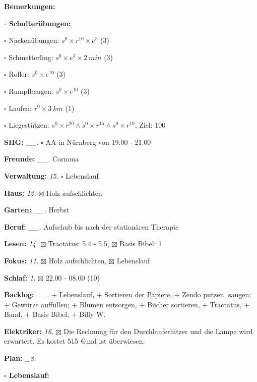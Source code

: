 \documentclass[10pt,a4paper]{article}
\newcommand\prop[1] {{\color {alizarin} {\bf #1}}}             %
\newcommand\opti[1] {{\color {amethyst} {\bf #1}}}             %
\newcommand\mand[1] {{\color {burntorange} {\bf #1}}}          %
\newcommand\topspace{\vskip -15pt \hskip 20pt}
\newcommand\bottomspace{\vskip 4pt}
\newcommand\n[1] { {\sl #1.} \hskip 5pt }
\begin{document}
\begin{mdframed}[style=daystyle]
\begin{labeling}{{\mand {Bemerkungen:}}}
\begin{minipage}{0.75\textwidth}
\begin{labeling}{\prop {$\square$ {Schulterübungen:}}}
      \item[$\square$ Nackenübungen:]   $s^0 \times r^{10} \times e^3$ (3)
      \item[$\square$ Schmetterling:]   $s^0 \times e^3 \times 2\ min$ (3)
      \item[$\square$ Roller:]          $s^0 \times e^{10}$ (3)
      \item[$\square$ Rumpfbeugen:]     $s^0 \times e^{10}$ (3)
      \item[$\square$ Laufen:]          $r^0 \times 3\ km$ (1)
      \item[$\square$ Liegestützen:]    $s^0 \times r^{20} \land s^0 \times r^{15} \land s^0 \times r^{10}$, Ziel: 100
      \end{labeling}
    \end{minipage}
    \bottomspace        
  \item[{\mand {SHG:}}]          \n{\_\_} $\square$ AA in Nürnberg von 19.00 - 21.00
  \item[{\mand {Freunde:}}]      \n{\_\_} Cornona
  \item[{\mand {Verwaltung:}}]     \n{15} $\square$ Lebenslauf
  \item[{\mand {Haus:}}]           \n{12} $\boxtimes$ Holz aufschlichten
  \item[{\mand {Garten:}}]       \n{\_\_} Herbst
  \item[{\mand {Beruf:}}]        \n{\_\_} Aufschub bis nach der stationären Therapie
  \item[{\mand {Lesen:}}]          \n{14} $\boxtimes$ Tractatus: 5.4 - 5.5, $\boxtimes$ Basis Bibel: 1
  \item[{\mand {Fokus:}}]          \n{11} $\boxtimes$ Holz aufschlichten, $\boxtimes$ Lebenslauf
  \item[{\mand {Schlaf:}}]          \n{1} $\boxtimes$ 22.00 - 08.00 (10)
  \item[{\mand {Backlog:}}]      \n{\_\_} 
      $+$ Lebenslauf, $+$ Sortieren der Papiere,
      $+$ Zendo putzen, saugen; $+$ Gewürze auffüllen; $+$ Blumen entsorgen, $+$ Bücher sortieren,
      $+$ Tractatus, $+$ Band, $+$ Basis Bibel, $+$ Billy W.
  \item[{\opti {Elektriker:}}]     \n{16} $\boxtimes$ Die Rechnung für den Durchlauferhitzer und die Lampe wird erwartert. 
    Es kostet 515 \euro und ist überwiesen.
  \item[{\mand {Plan:}}]          \n{\_8}
    \topspace
    \begin{minipage}{0.75\textwidth}  
      \begin{labeling}{\prop {$\square$ {Lebenslauf:}}} 

\end{labeling}
\end{minipage}
\end{labeling}
\end{mdframed}
\end{document}
